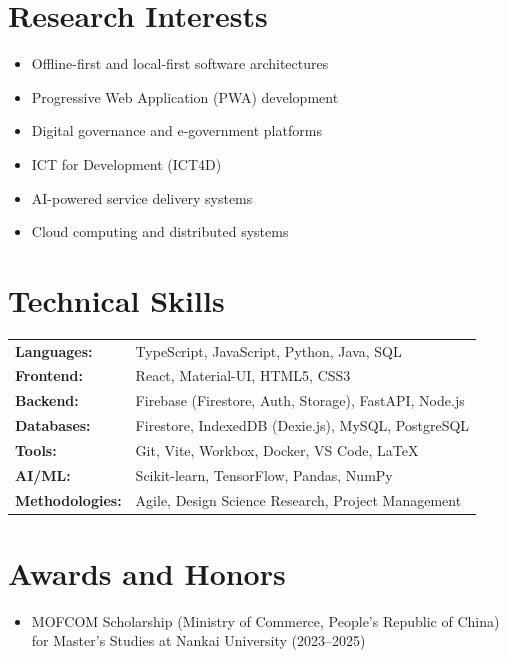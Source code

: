 \section*{Research Interests}

\begin{itemize}
  \item Offline-first and local-first software architectures
  \item Progressive Web Application (PWA) development
  \item Digital governance and e-government platforms
  \item ICT for Development (ICT4D)
  \item AI-powered service delivery systems
  \item Cloud computing and distributed systems
\end{itemize}

\section*{Technical Skills}

\begin{tabular}{@{} p{4cm} p{10cm}}
\textbf{Languages:}     & TypeScript, JavaScript, Python, Java, SQL \\
\textbf{Frontend:}      & React, Material-UI, HTML5, CSS3 \\
\textbf{Backend:}       & Firebase (Firestore, Auth, Storage), FastAPI, Node.js \\
\textbf{Databases:}     & Firestore, IndexedDB (Dexie.js), MySQL, PostgreSQL \\
\textbf{Tools:}         & Git, Vite, Workbox, Docker, VS Code, \LaTeX \\
\textbf{AI/ML:}         & Scikit-learn, TensorFlow, Pandas, NumPy \\
\textbf{Methodologies:} & Agile, Design Science Research, Project Management \\
\end{tabular}

\section*{Awards and Honors}

\begin{itemize}
  \item MOFCOM Scholarship (Ministry of Commerce, People's Republic of China) for Master's Studies at Nankai University (2023--2025)
\end{itemize}

